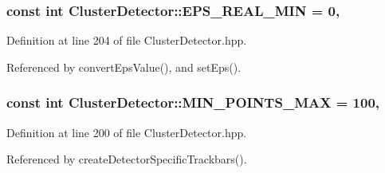 \hypertarget{classmultiscale_1_1analysis_1_1ClusterDetector_ad9542bde7e3bf36d501a0b203dc61e09}{
\subsubsection[{E\-P\-S\-\_\-\-R\-E\-A\-L\-\_\-\-M\-I\-N}]{\setlength{\rightskip}{0pt plus 5cm}const int Cluster\-Detector\-::\-E\-P\-S\-\_\-\-R\-E\-A\-L\-\_\-\-M\-I\-N = 0\hspace{0.3cm}{\ttfamily [static]}, {\ttfamily [private]}}}\label{classmultiscale_1_1analysis_1_1ClusterDetector_ad9542bde7e3bf36d501a0b203dc61e09}


Definition at line 204 of file Cluster\-Detector.\-hpp.



Referenced by convert\-Eps\-Value(), and set\-Eps().

\hypertarget{classmultiscale_1_1analysis_1_1ClusterDetector_aabb41b5c6e865ee33cbb27568cae5a2d}{
\subsubsection[{M\-I\-N\-\_\-\-P\-O\-I\-N\-T\-S\-\_\-\-M\-A\-X}]{\setlength{\rightskip}{0pt plus 5cm}const int Cluster\-Detector\-::\-M\-I\-N\-\_\-\-P\-O\-I\-N\-T\-S\-\_\-\-M\-A\-X = 100\hspace{0.3cm}{\ttfamily [static]}, {\ttfamily [private]}}}\label{classmultiscale_1_1analysis_1_1ClusterDetector_aabb41b5c6e865ee33cbb27568cae5a2d}


Definition at line 200 of file Cluster\-Detector.\-hpp.



Referenced by create\-Detector\-Specific\-Trackbars().


